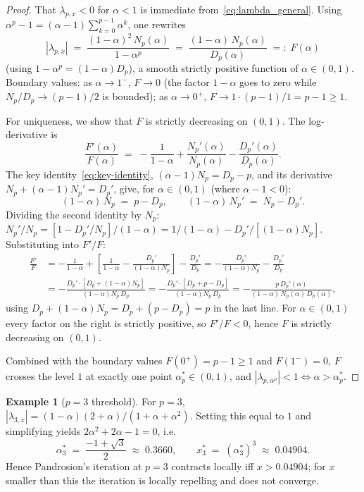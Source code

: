 \documentclass[11pt,a4paper]{article}
\theoremstyle{definition}
\newtheorem{example}{Example}[section]
\begin{document}
\begin{proof}
That $\lambda_{p,x} < 0$ for $\alpha < 1$ is immediate from~\eqref{eq:lambda_general}. Using $\alpha^p - 1 = (\alpha - 1) \sum_{k=0}^{p-1} \alpha^k$, one rewrites
\[
  |\lambda_{p,x}|
  \;=\; \frac{(1-\alpha)^2 \, N_p(\alpha)}{1 - \alpha^p}
  \;=\; \frac{(1 - \alpha)\, N_p(\alpha)}{D_p(\alpha)} \;=:\; F(\alpha)
\]
(using $1 - \alpha^p = (1-\alpha) D_p$), a smooth strictly positive function of $\alpha \in (0, 1)$. Boundary values: as $\alpha \to 1^-$, $F \to 0$ (the factor $1-\alpha$ goes to zero while $N_p/D_p \to (p-1)/2$ is bounded); as $\alpha \to 0^+$, $F \to 1 \cdot (p-1)/1 = p - 1 \geq 1$.

For uniqueness, we show that $F$ is strictly decreasing on $(0, 1)$. The log-derivative is
\[
  \frac{F'(\alpha)}{F(\alpha)}
  \;=\; -\frac{1}{1-\alpha} + \frac{N_p'(\alpha)}{N_p(\alpha)} - \frac{D_p'(\alpha)}{D_p(\alpha)}.
\]
The key identity~\eqref{eq:key-identity}, $(\alpha - 1) N_p = D_p - p$, and its derivative $N_p + (\alpha - 1) N_p' = D_p'$, give, for $\alpha \in (0, 1)$ (where $\alpha - 1 < 0$):
\[
  (1-\alpha)\, N_p \;=\; p - D_p,
  \qquad
  (1-\alpha)\, N_p' \;=\; N_p - D_p'.
\]
Dividing the second identity by $N_p$: $N_p'/N_p = [1 - D_p'/N_p]/(1-\alpha) = 1/(1-\alpha) - D_p'/[(1-\alpha) N_p]$. Substituting into $F'/F$:
\begin{align*}
  \frac{F'}{F}
  &= -\frac{1}{1-\alpha} + \left[\frac{1}{1-\alpha} - \frac{D_p'}{(1-\alpha) N_p}\right] - \frac{D_p'}{D_p}
   = -\frac{D_p'}{(1-\alpha) N_p} - \frac{D_p'}{D_p} \\
  &= -\frac{D_p' \cdot [D_p + (1-\alpha) N_p]}{(1-\alpha) N_p\, D_p}
   = -\frac{D_p' \cdot [D_p + p - D_p]}{(1-\alpha) N_p\, D_p}
   = -\frac{p\, D_p'(\alpha)}{(1-\alpha)\, N_p(\alpha)\, D_p(\alpha)},
\end{align*}
using $D_p + (1-\alpha) N_p = D_p + (p - D_p) = p$ in the last line. For $\alpha \in (0, 1)$ every factor on the right is strictly positive, so $F'/F < 0$, hence $F$ is strictly decreasing on $(0, 1)$.

Combined with the boundary values $F(0^+) = p - 1 \geq 1$ and $F(1^-) = 0$, $F$ crosses the level $1$ at exactly one point $\alpha^\ast_p \in (0, 1)$, and $|\lambda_{p, \alpha^p}| < 1 \iff \alpha > \alpha^\ast_p$.
\end{proof}

\begin{example}[$p = 3$ threshold]\label{ex:p3-threshold}
For $p = 3$, $|\lambda_{3,x}| = (1-\alpha)(2+\alpha)/(1 + \alpha + \alpha^2)$. Setting this equal to $1$ and simplifying yields $2\alpha^2 + 2\alpha - 1 = 0$, i.e.
\[
  \alpha^\ast_3 \;=\; \frac{-1 + \sqrt{3}}{2} \;\approx\; 0.3660,
  \qquad
  x^\ast_3 \;=\; (\alpha^\ast_3)^3 \;\approx\; 0.04904.
\]
Hence Pandrosion's iteration at $p = 3$ contracts locally iff $x > 0.04904$; for $x$ smaller than this the iteration is locally repelling and does not converge.
\end{example}
\end{document}

